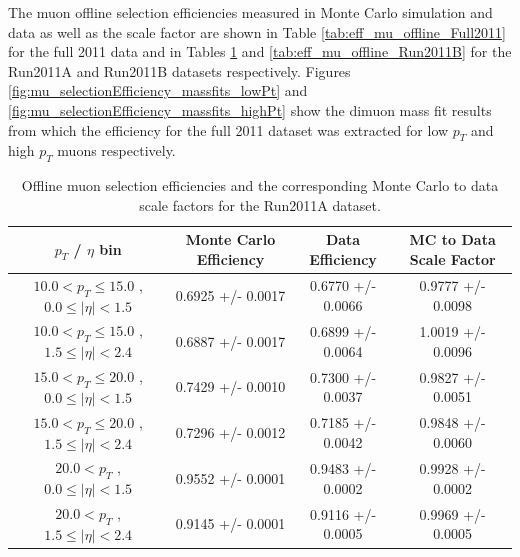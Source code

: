 The muon offline selection efficiencies measured in Monte Carlo simulation and data as well as the scale 
factor are shown in Table \ref{tab:eff_mu_offline_Full2011} for the full 2011 data and in Tables 
\ref{tab:eff_mu_offline_Run2011A} and \ref{tab:eff_mu_offline_Run2011B} for 
the Run2011A and Run2011B datasets respectively. Figures \ref{fig:mu_selectionEfficiency_massfits_lowPt}
and \ref{fig:mu_selectionEfficiency_massfits_highPt} show the dimuon mass fit 
results from which the efficiency for the full 2011 dataset was extracted for
low $p_{T}$ and high $p_{T}$ muons respectively.



 \begin{table}[!ht]
 \begin{center} 
 \begin{tabular}{|c|c|c|c|}
 \hline
 $p_{T}$ / $\eta$ bin    &  Monte Carlo Efficiency    &  Data Efficiency   &  MC to Data Scale Factor \\   \hline           
$ 10.0 < p_{T} \le  15.0$ , $  0.0  \le |\eta| <   1.5$   &       0.6925 +/- 0.0017   &       0.6770 +/- 0.0066   &       0.9777 +/- 0.0098   \\   
\hline
$ 10.0 < p_{T} \le  15.0$ , $  1.5  \le |\eta| <   2.4$   &       0.6887 +/- 0.0017   &       0.6899 +/- 0.0064   &       1.0019 +/- 0.0096   \\   
\hline
$ 15.0 < p_{T} \le  20.0$ , $  0.0  \le |\eta| <   1.5$   &       0.7429 +/- 0.0010   &       0.7300 +/- 0.0037   &       0.9827 +/- 0.0051   \\   
\hline
$ 15.0 < p_{T} \le  20.0$ , $  1.5  \le |\eta| <   2.4$   &       0.7296 +/- 0.0012   &       0.7185 +/- 0.0042   &       0.9848 +/- 0.0060   \\   
\hline
$ 20.0 < p_{T} $ , $  0.0  \le |\eta| <   1.5$   &       0.9552 +/- 0.0001   &       0.9483 +/- 0.0002   &       0.9928 +/- 0.0002   \\   
\hline
$ 20.0 < p_{T} $ , $  1.5  \le |\eta| <   2.4$   &       0.9145 +/- 0.0001   &       0.9116 +/- 0.0005   &       0.9969 +/- 0.0005   \\   
\hline
\end{tabular}
\caption{Offline muon selection efficiencies and the corresponding Monte Carlo to data scale factors for the
Run2011A dataset.}
\label{tab:eff_mu_offline_Run2011A}
\end{center}
\end{table}


